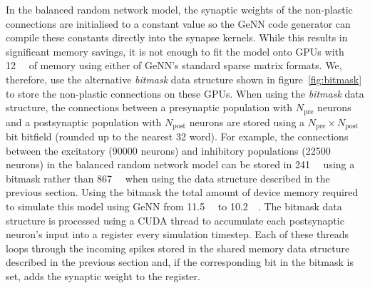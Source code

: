 \documentclass[utf8]{frontiersSCNS} %
\begin{document}
In the balanced random network model, the synaptic weights of the non-plastic connections are initialised to a constant value so the GeNN code generator can compile these constants directly into the synapse kernels. 
While this results in significant memory savings, it is not enough to fit the model onto GPUs with \SI{12}{\giga\byte} of memory using either of GeNN's standard sparse matrix formats.
We, therefore, use the alternative \textit{bitmask} data structure shown in figure~\ref{fig:bitmask} to store the non-plastic connections on these GPUs.
When using the \textit{bitmask} data structure, the connections between a presynaptic population with $N_{\text{pre}}$ neurons and a postsynaptic population with $N_{\text{post}}$ neurons are stored using a $N_{\text{pre}} \times N_{\text{post}}$ bit bitfield (rounded up to the nearest \SI{32}{\bit} word).
For example, the connections between the excitatory (\num{90000} neurons) and inhibitory populations (\num{22500} neurons) in the balanced random network model can be stored in \SI{241}{\mebi\byte} using a bitmask rather than \SI{867}{\mebi\byte} when using the data structure described in the previous section.
Using the bitmask the total amount of device memory required to simulate this model using GeNN from \SI{11.5}{\giga\byte} to \SI{10.2}{\giga\byte}.
The bitmask data structure is processed using a CUDA thread to accumulate each postsynaptic neuron's input into a register every simulation timestep.
Each of these threads loops through the incoming spikes stored in the shared memory data structure described in the previous section and, if the corresponding bit in the bitmask is set, adds the synaptic weight to the register.
\end{document}
